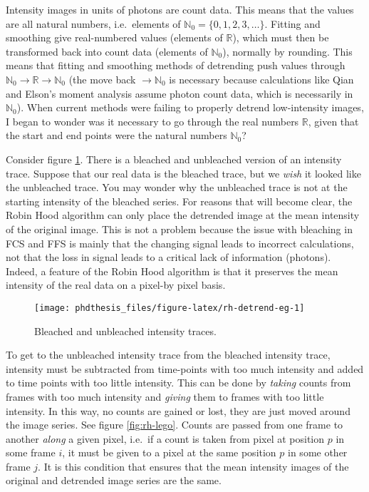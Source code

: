 \documentclass[12pt,]{book}
\theoremstyle{definition}
\theoremstyle{definition}
\theoremstyle{definition}
\theoremstyle{remark}
\begin{document}
Intensity images in units of photons are count data. This means that the
values are all natural numbers, i.e.~elements of
\(\mathbb{N}_0=\{0, 1, 2, 3, \ldots\}\). Fitting and smoothing give
real-numbered values (elements of \(\mathbb{R}\)), which must then be
transformed back into count data (elements of \(\mathbb{N}_0\)),
normally by rounding. This means that fitting and smoothing methods of
detrending push values through
\(\mathbb{N}_0 \rightarrow \mathbb{R} \rightarrow \mathbb{N}_0\) (the
move back \(\rightarrow \mathbb{N}_0\) is necessary because calculations
like Qian and Elson's moment analysis assume photon count data, which is
necessarily in \(\mathbb{N}_0\)). When current methods were failing to
properly detrend low-intensity images, I began to wonder was it
necessary to go through the real numbers \(\mathbb{R}\), given that the
start and end points were the natural numbers \(\mathbb{N}_0\)?

Consider figure \ref{fig:rh-detrend-eg}. There is a bleached and
unbleached version of an intensity trace. Suppose that our real data is
the bleached trace, but we \emph{wish} it looked like the unbleached
trace. You may wonder why the unbleached trace is not at the starting
intensity of the bleached series. For reasons that will become clear,
the Robin Hood algorithm can only place the detrended image at the mean
intensity of the original image. This is not a problem because the issue
with bleaching in FCS and FFS is mainly that the changing signal leads
to incorrect calculations, not that the loss in signal leads to a
critical lack of information (photons). Indeed, a feature of the Robin
Hood algorithm is that it preserves the mean intensity of the real data
on a pixel-by pixel basis.



\begin{figure}

\texttt{[image: phdthesis\_files/figure-latex/rh-detrend-eg-1]} \hfill{}

\caption{Bleached and unbleached intensity traces.}\label{fig:rh-detrend-eg}
\end{figure}

To get to the unbleached intensity trace from the bleached intensity
trace, intensity must be subtracted from time-points with too much
intensity and added to time points with too little intensity. This can
be done by \emph{taking} counts from frames with too much intensity and
\emph{giving} them to frames with too little intensity. In this way, no
counts are gained or lost, they are just moved around the image series.
See figure \ref{fig:rh-lego}. Counts are passed from one frame to
another \emph{along} a given pixel, i.e.~if a count is taken from pixel
at position \(p\) in some frame \(i\), it must be given to a pixel at
the same position \(p\) in some other frame \(j\). It is this condition
that ensures that the mean intensity images of the original and
detrended image series are the same.
\end{document}

